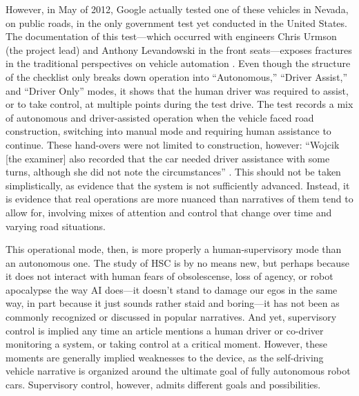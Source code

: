 
However, in May of 2012,
Google actually tested one of these vehicles in Nevada, on public
roads, in the only government test yet conducted in the United States.
The documentation of this test---which occurred with engineers Chris
Urmson (the project lead) and Anthony Levandowski in the front
seats---exposes fractures in the traditional perspectives on vehicle
automation \cite{harrisNevada}. Even though the structure of the
checklist only breaks down operation into ``Autonomous,'' ``Driver
Assist,'' and ``Driver Only'' modes, it shows that the human driver
was required to assist, or to take control, at multiple points during
the test drive. The test records a mix of autonomous and
driver-assisted operation when the vehicle faced road construction,
switching into manual mode and requiring human assistance to continue.
These hand-overs were not limited to construction, however: 
``Wojcik [the examiner] also recorded that the car needed driver
assistance with some turns, although she did not note the
circumstances'' \cite{harrisNevada}. This should not be taken
simplistically, as evidence that the system is not sufficiently
advanced. Instead, it is evidence that real operations are more
nuanced than narratives of them tend to allow for, involving mixes of
attention and control that change over time and varying road situations.

This operational mode, then, is more properly a human-supervisory mode
than an autonomous one. The study of HSC is by no means new, but
perhaps because it does not interact with human fears of obsolescense,
loss of agency, or robot apocalypse the way AI does---it doesn't stand
to damage our egos in the same way, in part because it just
sounds rather staid and boring---it has not been as commonly
recognized or discussed in popular narratives. And yet, supervisory
control is implied any time an article mentions a human driver or
co-driver monitoring a system, or taking control at a critical moment.
However, these moments are generally implied weaknesses to the device,
as the self-driving vehicle narrative is organized around the ultimate
goal of fully autonomous robot cars. Supervisory control, however,
admits different goals and possibilities.

